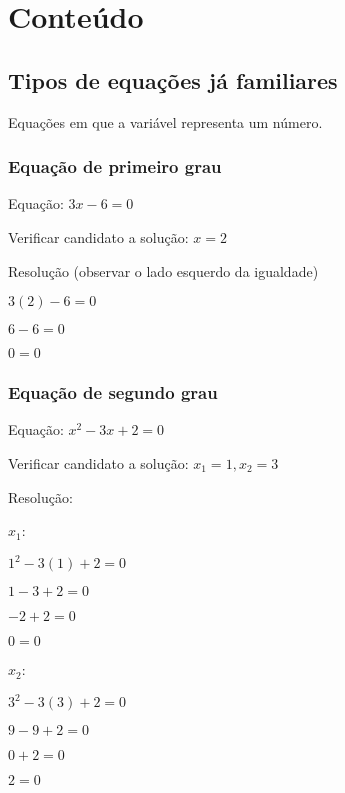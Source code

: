 \documentclass[a4paper]{article}
\begin{document}

\section{Conteúdo}

\subsection{Tipos de equações já familiares}

Equações em que a variável representa um número.

\subsubsection{Equação de primeiro grau}

Equação: $3x -6 = 0$

Verificar candidato a solução: $x=2$

Resolução (observar o lado esquerdo da igualdade)

$3(2) - 6 =0$

$ 6-6 =0$

$0 = 0$

\newpage
\subsubsection{Equação de segundo grau}

Equação: $x^2 - 3x + 2 = 0$

Verificar candidato a solução: $x_1 = 1, x_2 = 3$

Resolução:
\begin{multicols}{2}
$x_1$:

$1^2 -3(1) + 2 = 0$

$1 - 3 + 2 = 0$

$-2 + 2 = 0$

$0=0$

\columnbreak

$x_2$:

$3^2 -3(3) +2 = 0$

$9-9+2 = 0 $

$0 + 2 = 0$

$2=0$

\end{multicols}
\end{document}
